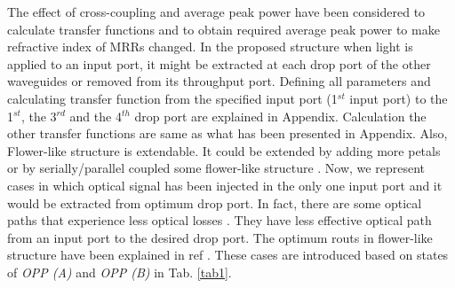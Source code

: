 \documentclass{osa-article}
\begin{document}
 The effect of cross-coupling and average peak power have been considered to calculate transfer functions and to obtain required average peak power to make refractive index of MRRs changed. In the proposed structure when light is applied to an input port, it might be extracted at each drop port of the other waveguides or removed from its throughput port. Defining all parameters and calculating transfer function from the specified input port (1$^{st}$ input port) to the 1$^{st}$, the 3$^{rd}$ and the 4$^{th}$ drop port are explained in Appendix. Calculation the other transfer functions are same as what has been presented in Appendix. Also, Flower-like structure is extendable. It could be extended by adding more petals or by serially/parallel coupled some flower-like structure \cite{razaghi2016design}. Now, we represent cases in which optical signal has been injected in the only one input port and it would be extracted from optimum drop port. In fact, there are some optical paths that experience less optical losses \cite{razaghi2016design}. They have less effective optical path from an input port to the desired drop port. The optimum routs in flower-like structure have been explained in ref \cite{razaghi2016design}. These cases are introduced based on states of \textit{OPP (A)} and \textit{OPP (B)} in Tab. \ref{tab1}.
\end{document}
